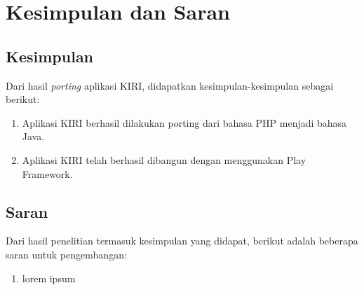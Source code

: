\chapter{Kesimpulan dan Saran}
\label{chap:kesimpulan_saran}

\section{Kesimpulan}
\label{sec:kesimpulan}

Dari hasil \textit{porting} aplikasi KIRI, didapatkan kesimpulan-kesimpulan sebagai berikut:
	\begin{enumerate}
		\item Aplikasi KIRI berhasil dilakukan porting dari bahasa PHP menjadi bahasa Java.
		\item Aplikasi KIRI telah berhasil dibangun dengan menggunakan Play Framework.
	\end{enumerate}

\section{Saran}
\label{sec:saran}
Dari hasil penelitian termasuk kesimpulan yang didapat, berikut adalah beberapa saran untuk pengembangan:
\begin{enumerate}
	\item lorem ipsum
\end{enumerate}